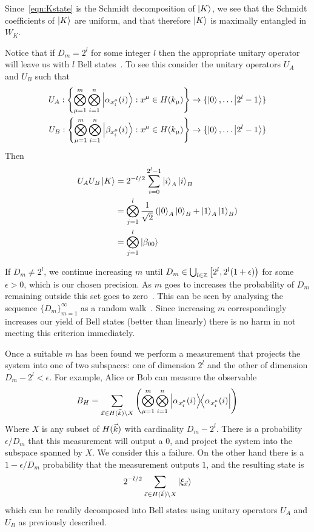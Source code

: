 Since~\eqref{eqn:Kstate} is the Schmidt decomposition of $\ket{K}$, we see that the Schmidt coefficients of $\ket{K}$ are uniform, and that therefore $\ket{K}$ is maximally entangled in $W_K$.

Notice that if $D_m = 2^l$ for some integer $l$ then the appropriate unitary operator will leave us with $l$ Bell states~\cite{bennett1996concentrating}. To see this consider the unitary operators $U_A$ and $U_B$ such that
\begin{align*}
U_A : \left\{
\bigotimes_{\mu=1}^m\bigotimes_{i=1}^n 
\ket{\alpha_{x_i^\mu}(i)}: x^\mu \in H(k_\mu) 
\right\} &\rightarrow \{\ket{0}, \ldots \ket{2^l-1
}\} \\
U_B :\left\{
\bigotimes_{\mu=1}^m\bigotimes_{i=1}^n 
\ket{\beta_{x_i^\mu}(i)}: x^\mu \in H(k_\mu) 
\right\} &\rightarrow \{\ket{0}, \ldots \ket{2^l-1
}\}
\end{align*}
Then
\begin{align*}
U_A U_B \ket{K} &= 2^{-l/2}\sum_{i=0}^{2^l-1} \ket{i}_A\ket{i}_B\\
&= \bigotimes_{j=1}^l \frac{1}{\sqrt{2}} \left(  \ket{0}_A \ket{0}_B + \ket{1}_A \ket{1}_B \right) \\
&= \bigotimes_{j=1}^l \ket{\beta_{00}}
\end{align*}

If $D_m \neq 2^l$, we continue increasing $m$ until $D_m \in \bigcup_{l \in \mathbb{Z} }\left[2^l, 2^l(1+\epsilon)\right)$ for some $\epsilon > 0$, which is our chosen precision. As $m$ goes to increases the probability of $D_m$ remaining outside this set goes to zero~\cite{bennett1996concentrating}. This can be seen by analysing the sequence $\{D_m\}_{m=1}^\infty$ as a random walk~\cite{bennett1996concentrating}.
Since increasing $m$ correspondingly increases our yield of Bell states (better than linearly) there is no harm in not meeting this criterion immediately.

Once a suitable $m$ has been found we perform a measurement that projects the system into one of two subspaces: one of dimension $2^l$ and the other of dimension $D_m-2^l<\epsilon$. For example, Alice or Bob can measure the observable
$$
B_H = \sum_{\vx \in H(\vk) \setminus X} \left(
\bigotimes_{\mu=1}^m\bigotimes_{i=1}^n 
\dyad{\alpha_{x_i^\mu}(i)}{\alpha_{x_i^\mu}(i)} \right)
$$
Where $X$ is any subset of $H({\vec{k}})$ with cardinality $D_m - 2^l$.
There is a probability $\epsilon / D_m$ that this measurement will output a $0$, and project the system into the subspace spanned by $X$. We consider this a failure. On the other hand there is a $1-\epsilon / D_m$ probability that the measurement outputs $1$, and the resulting state is
$$
2^{-l/2} \sum_{{\vec{x}} \in H({\vec{k}}) \setminus X} \ket{ \xi_{\vec{x}} }
$$
which can be readily decomposed into Bell states using unitary operators $U_A$ and $U_B$ as previously described.

